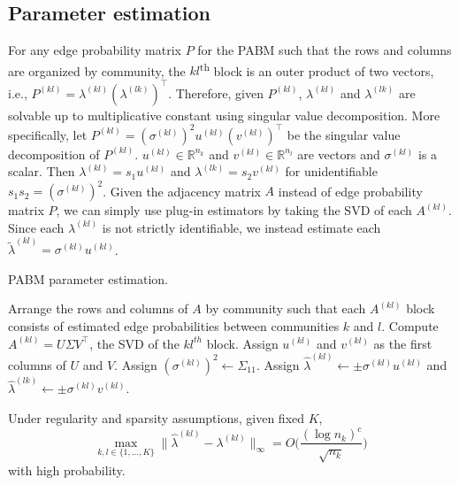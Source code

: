 \documentclass[12pt]{article}
\begin{document}
\hypertarget{parameter-estimation}{%
\subsection{Parameter estimation}\label{parameter-estimation}}

For any edge probability matrix \(P\) for the PABM such that the rows
and columns are organized by community, the \(kl\)\textsuperscript{th}
block is an outer product of two vectors, i.e.,
\(P^{(kl)} = \lambda^{(kl)} (\lambda^{(lk)})^\top\). Therefore, given
\(P^{(kl)}\), \(\lambda^{(kl)}\) and \(\lambda^{(lk)}\) are solvable
up to multiplicative constant using singular value
decomposition. More specifically, 
let \(P^{(kl)} = (\sigma^{(kl)})^2 u^{(kl)} (v^{(kl)})^\top\)
be the singular value decomposition of \(P^{(kl)}\).
\(u^{(kl)} \in \mathbb{R}^{n_k}\) and 
\(v^{(kl)} \in \mathbb{R}^{n_l}\) are vectors
and \(\sigma^{(kl)}\) is a scalar. Then \(\lambda^{(kl)} = s_1 u^{(kl)}\)
and \(\lambda^{(lk)} = s_2 v^{(kl)}\) 
for unidentifiable $s_1 s_2 = (\sigma^{(kl)})^2$.
Given the adjacency matrix \(A\)
instead of edge probability matrix \(P\), we can simply use plug-in
estimators by taking the SVD of each $A^{(kl)}$. 
Since each $\lambda^{(kl)}$ is not strictly identifiable,
we instead estimate each $\tilde{\lambda}^{(kl)} = \sigma^{(kl)} u^{(kl)}$. 

\begin{algorithm}[t]
  \DontPrintSemicolon
  \SetAlgoLined
  \caption{PABM parameter estimation.}
  Arrange the rows and columns of $A$ by community such that each 
  $A^{(kl)}$ block consists of estimated edge probabilities between 
  communities $k$ and $l$.\;
   {
    Compute $A^{(kl)} = U \Sigma V^\top$, the SVD of the $kl^{th}$ 
    block.\;
    Assign $u^{(kl)}$ and $v^{(kl)}$ as the first columns of $U$ and $V$. 
    Assign $(\sigma^{(kl)})^2 \leftarrow \Sigma_{11}$.\;
    Assign $\hat{\lambda}^{(kl)} \leftarrow \pm \sigma^{(kl)} u^{(kl)}$ and 
    $\hat{\lambda}^{(lk)} \leftarrow \pm \sigma^{(kl)} v^{(kl)}$.
  }
\end{algorithm}

\begin{theorem}
\label{theorem6}
Under regularity and sparsity assumptions, given fixed $K$, 
\begin{equation} \label{eq:thm6}
\max_{k, l \in \{1, ..., K\}} 
\|\hat{\lambda}^{(kl)} - \lambda^{(kl)}\|_{\infty} = 
O\bigg(\frac{(\log n_k)^c}{\sqrt{n_k}} \bigg)
\end{equation}
with high probability.
\end{theorem}
\end{document}
